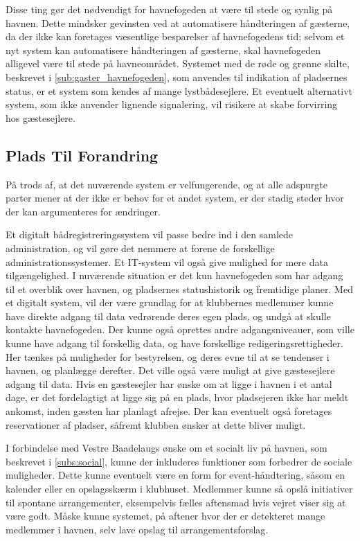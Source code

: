 Disse ting gør det nødvendigt for havnefogeden at være til stede og synlig på havnen. Dette mindsker gevinsten ved at automatisere håndteringen af gæsterne, da der ikke kan foretages væsentlige besparelser af havnefogedens tid; selvom et nyt system kan automatisere håndteringen af gæsterne, skal havnefogeden alligevel være til stede på havneområdet. Systemet med de røde og grønne skilte, beskrevet i \cref{sub:gaster_havnefogeden}, som anvendes til indikation af pladsernes status, er et system som kendes af mange lystbådesejlere. Et eventuelt alternativt system, som ikke anvender lignende signalering, vil risikere at skabe forvirring hos gæstesejlere.

\subsection{Plads Til Forandring}

På trods af, at det nuværende system er velfungerende, og at alle adspurgte parter mener at der ikke er behov for et andet system, er der stadig steder hvor der kan argumenteres for ændringer.

Et digitalt bådregistreringssystem vil passe bedre ind i den samlede administration, og vil gøre det nemmere at forene de forskellige administrationssystemer. Et IT-system vil også give mulighed for mere data tilgængelighed. I nuværende situation er det kun havnefogeden som har adgang til et overblik over havnen, og pladsernes statushistorik og fremtidige planer. Med et digitalt system, vil der være grundlag for at klubbernes medlemmer kunne have direkte adgang til data vedrørende deres egen plads, og undgå at skulle kontakte havnefogeden. Der kunne også oprettes andre adgangsniveauer, som ville kunne have adgang til forskellig data, og have forskellige redigeringsrettigheder. Her tænkes på muligheder for bestyrelsen, og deres evne til at se tendenser i havnen, og planlægge derefter. Det ville også være muligt at give gæstesejlere adgang til data. Hvis en gæstesejler har ønske om at ligge i havnen i et antal dage, er det fordelagtigt at ligge sig på en plads, hvor pladsejeren ikke har meldt ankomst, inden gæsten har planlagt afrejse. Der kan eventuelt også foretages reservationer af pladser, såfremt klubben ønsker at dette bliver muligt.

I forbindelse med Vestre Baadelaugs ønske om et socialt liv på havnen, som beskrevet i \cref{subs:social}, kunne der inkluderes funktioner som forbedrer de sociale muligheder. Dette kunne eventuelt være en form for event-håndtering, såsom en kalender eller en opslagsskærm i klubhuset. Medlemmer kunne så opslå initiativer til spontane arrangementer, eksempelvis fælles aftensmad hvis vejret viser sig at være godt. Måske kunne systemet, på aftener hvor der er detekteret mange medlemmer i havnen, selv lave opslag til arrangementsforslag.

